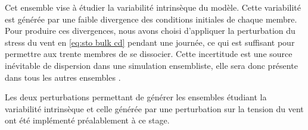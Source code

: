 Cet ensemble vise à étudier la variabilité intrinsèque du modèle. Cette variabilité est générée par une faible divergence des conditions initiales de chaque membre. Pour produire ces divergences, nous avons choisi d'appliquer la perturbation du stress du vent en \autoref{eq:sto bulk cd} pendant une journée, ce qui est suffisant pour permettre aux trente membres de se dissocier. Cette incertitude est une source inévitable de dispersion dans une simulation ensembliste, elle sera donc présente dans tous les autres ensembles \cite{hogg_circumpolar_2022}.

Les deux perturbations permettant de générer les ensembles étudiant la variabilité intrinsèque et celle générée par une perturbation sur la tension du vent ont été implémenté préalablement à ce stage.






